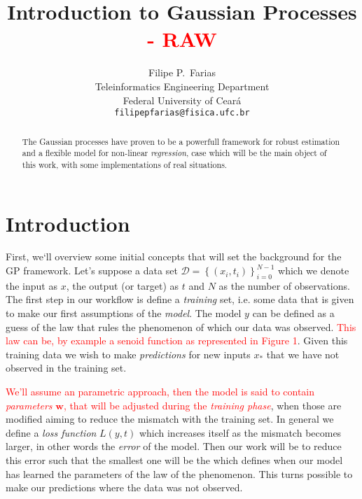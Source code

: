 \documentclass[11pt]{article} %
\title{Introduction to Gaussian Processes \textcolor{red}{ - RAW}}
\author{
Filipe P.~Farias \\
Teleinformatics Engineering Department\\
Federal University of Ceará\\
\texttt{filipepfarias@fisica.ufc.br} \\
}
\begin{document}
\maketitle

\begin{abstract}
   The Gaussian processes have proven to be a powerfull framework for robust estimation and a flexible model for non-linear \textit{regression}, case which will be the main object of this work, with some implementations of real situations.%
\end{abstract}

\section{Introduction}
\nocite{hennig2013gaussian}

First, we`ll overview some initial concepts that will set the background for the GP framework. Let's suppose a data set $\mathcal{D} = \left\{ \left( x_i,t_i \right) \right\}_{i=0}^{N-1}$ which we denote the input as $x$, the output (or target) as $t$ and $N$ as the number of observations. The first step in our workflow is define a \textit{training} set, i.e. some data that is given to make our first assumptions of the \textit{model}. The model $y$ can be defined as a guess of the law that rules the phenomenon of which our data was observed. \textcolor{red}{This law can be, by example a senoid function as represented in Figure 1}. Given this training data we wish to make \textit{predictions} for new inputs $x_*$ that we have not observed in the training set.


\textcolor{red}{We'll assume an parametric approach, then the model is said to contain \textit{parameters} $\mathbf{w}$, that will be adjusted during the \textit{training phase}}, when those are modified aiming to reduce the mismatch with the training set. In general we define a \textit{loss function} $L\left( y,t \right)$ which increases itself as the mismatch becomes larger, in other words the \textit{error} of the model. Then our work will be to reduce this error such that the smallest one will be the which defines when our model has learned the parameters of the law of the phenomenon. This turns possible to make our predictions where the data was not observed.
\end{document}
